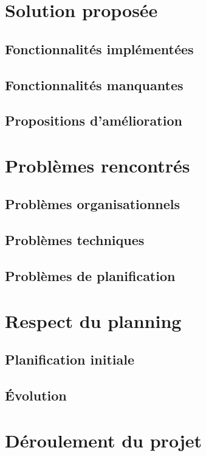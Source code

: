 \documentclass[11pt,a4paper,oldfontcommands]{memoir}
\begin{document}
\section{Solution proposée}

\subsection{Fonctionnalités implémentées}

\subsection{Fonctionnalités manquantes}

\subsection{Propositions d'amélioration}

\section{Problèmes rencontrés}

\subsection{Problèmes organisationnels}

\subsection{Problèmes techniques}

\subsection{Problèmes de planification}

\section{Respect du planning}

\subsection{Planification initiale}

\subsection{Évolution}

\section{Déroulement du projet}
\end{document}
